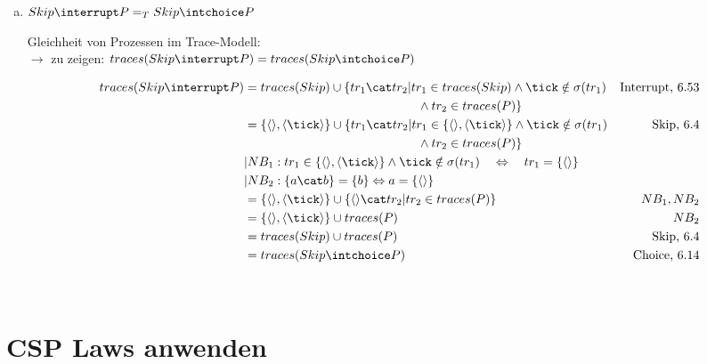 \documentclass{scrreprt}
\begin{document}
\begin{enumerate}[a)]
\item{
  $ Skip \interrupt P =_T Skip \intchoice P $

  Gleichheit von Prozessen im Trace-Modell:\\

  $\rightarrow$ zu zeigen: $traces(Skip \interrupt P) = traces(Skip \intchoice P)$

  \begin{align*}
    traces(Skip \interrupt P) &= traces(Skip) \cup \{tr_1 \cat tr_2 | tr_1 \in traces(Skip) \wedge \tick \notin \sigma(tr_1) & \text{Interrupt, 6.53}\\
                              &\hspace{4.9cm} \wedge tr_2 \in traces(P) \}\\
                              &= \{ \langle \rangle, \langle \tick \rangle \} \cup \{ tr_1 \cat tr_2 | tr_1 \in \{ \langle \rangle, \langle \tick \rangle \} \wedge \tick \notin \sigma(tr_1) & \text{Skip, 6.4}\\
                              &\hspace{4.9cm} \wedge tr_2 \in traces(P) \}\\
                              &|NB_1: tr_1 \in \{ \langle \rangle, \langle \tick \rangle \} \wedge \tick \notin \sigma(tr_1) \hspace{10pt} \Leftrightarrow \hspace{10pt} tr_1 = \{ \langle \rangle \}\\
                              &|NB_2: \{a \cat b\} = \{ b \} \Leftrightarrow a = \{ \langle \rangle \}\\
                              &= \{ \langle \rangle, \langle \tick \rangle \} \cup \{ \langle \rangle \cat tr_2 | tr_2 \in traces(P) \} & NB_1, NB_2\\
                              &= \{ \langle \rangle, \langle \tick \rangle \} \cup traces(P) & NB_2\\
                              &= traces(Skip) \cup traces(P) & \text{Skip, 6.4}\\
                              &= traces(Skip \intchoice P) & \text{Choice, 6.14}\\
  \end{align*}

  \flushright{\qedsymbol}\\
}
\end{enumerate}

\section{CSP Laws anwenden}
\end{document}
